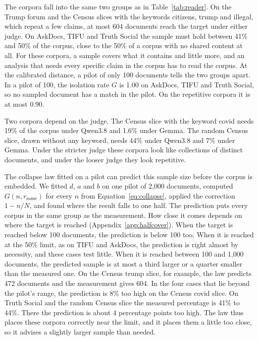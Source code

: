 The corpora fall into the same two groups as in Table~\ref{tab:reader}. On the Trump forum and the Census slices with the keywords citizens, trump and illegal, which repeat a few claims, at most 604 documents reach the target under either judge. On AskDocs, TIFU and Truth Social the sample must hold between 41\% and 50\% of the corpus, close to the 50\% of a corpus with no shared content at all. For these corpora, a sample covers what it contains and little more, and an analysis that needs every specific claim in the corpus has to read the corpus. At the calibrated distance, a pilot of only 100 documents tells the two groups apart. In a pilot of 100, the isolation rate $G$ is 1.00 on AskDocs, TIFU and Truth Social, so no sampled document has a match in the pilot. On the repetitive corpora it is at most 0.90.

Two corpora depend on the judge. The Census slice with the keyword covid needs 19\% of the corpus under Qwen3.8 and 1.6\% under Gemma. The random Census slice, drawn without any keyword, needs 44\% under Qwen3.8 and 7\% under Gemma. Under the stricter judge these corpora look like collections of distinct documents, and under the looser judge they look repetitive.

The collapse law fitted on a pilot can predict this sample size before the corpus is embedded. We fitted $d$, $a$ and $b$ on one pilot of 2{,}000 documents, computed $G(n, r_{\mathrm{same}})$ for every $n$ from Equation~\ref{eq:collapse}, applied the correction $1 - n/N$, and found where the result falls to one half. The prediction puts every corpus in the same group as the measurement. How close it comes depends on where the target is reached (Appendix~\ref{app:halfcover}). When the target is reached below 100 documents, the prediction is below 100 too. When it is reached at the 50\% limit, as on TIFU and AskDocs, the prediction is right almost by necessity, and these cases test little. When it is reached between 100 and 1{,}000 documents, the predicted sample is at most a third larger or a quarter smaller than the measured one. On the Census trump slice, for example, the law predicts 472 documents and the measurement gives 604. In the four cases that lie beyond the pilot's range, the prediction is 8\% too high on the Census covid slice. On Truth Social and the random Census slice the measured percentage is 41\% to 44\%. There the prediction is about 4 percentage points too high. The law thus places these corpora correctly near the limit, and it places them a little too close, so it advises a slightly larger sample than needed.

